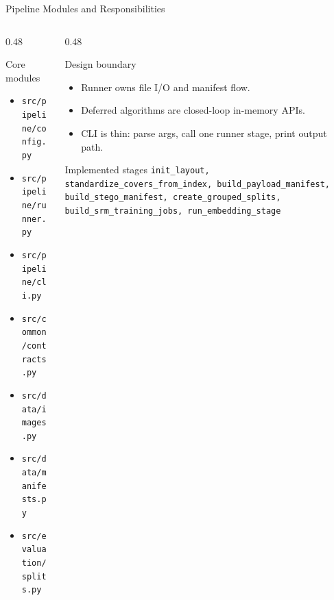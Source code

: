 \documentclass[aspectratio=169,11pt]{beamer}
\begin{document}
\begin{frame}{Pipeline Modules and Responsibilities}
\small
\begin{columns}[T]
\begin{column}{0.48\textwidth}
\begin{block}{Core modules}
\begin{itemize}
\item \texttt{src/pipeline/config.py}
\item \texttt{src/pipeline/runner.py}
\item \texttt{src/pipeline/cli.py}
\item \texttt{src/common/contracts.py}
\item \texttt{src/data/images.py}
\item \texttt{src/data/manifests.py}
\item \texttt{src/evaluation/splits.py}
\end{itemize}
\end{block}
\end{column}
\begin{column}{0.48\textwidth}
\begin{block}{Design boundary}
\begin{itemize}
\item Runner owns file I/O and manifest flow.
\item Deferred algorithms are closed-loop in-memory APIs.
\item CLI is thin: parse args, call one runner stage, print output path.
\end{itemize}
\end{block}
\begin{exampleblock}{Implemented stages}
\scriptsize
\texttt{init\_layout, standardize\_covers\_from\_index, build\_payload\_manifest, build\_stego\_manifest, create\_grouped\_splits, build\_srm\_training\_jobs, run\_embedding\_stage}
\end{exampleblock}
\end{column}
\end{columns}
\end{frame}
\end{document}
